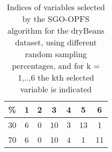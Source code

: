 \begin{table}
	\begin{center}
		\begin{tabular}{c c c c c c c}
			\% & 1 & 2 & 3 & 4 & 5 & 6 \\
			\hline
			30 & 6 & 0 & 10 & 3 & 13 & 1 \\
			70 & 6 & 0 & 10 & 4 & 1 & 11 \\
		\end{tabular}
	\end{center}
	\caption{Indices of variables selected by the SGO-OPFS algorithm for the dryBeans dataset, using different random sampling percentages, and for k = 1,..,6 the kth selected variable is indicated}
\end{table}